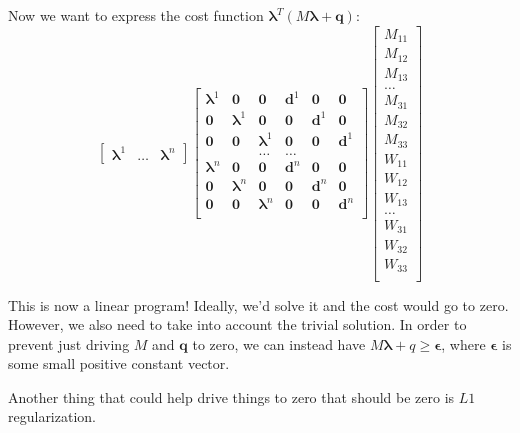 \documentclass{article}
\renewcommand{\vec}[1]{\boldsymbol{#1}}
\begin{document}
Now we want to express the cost function $\vec{\lambda}^T (M \vec{\lambda} + \vec{q})$:
\[
    \begin{bmatrix}
        \vec{\lambda} ^1 & \dots & \vec{\lambda} ^n
    \end{bmatrix}
    \begin{bmatrix}
        \vec{\lambda} ^1 & \vec{0} & \vec{0} & \vec{d}^1 & \vec{0} & \vec{0} \\
        \vec{0} & \vec{\lambda} ^1 & \vec{0} & \vec{0} & \vec{d}^1 & \vec{0} \\
        \vec{0} & \vec{0} & \vec{\lambda} ^1 & \vec{0} & \vec{0} & \vec{d}^1 \\
                & & \dots & \dots & & \\
        \vec{\lambda} ^n & \vec{0} & \vec{0} & \vec{d}^n & \vec{0} & \vec{0} \\
        \vec{0} & \vec{\lambda} ^n & \vec{0} & \vec{0} & \vec{d}^n & \vec{0} \\
        \vec{0} & \vec{0} & \vec{\lambda} ^n & \vec{0} & \vec{0} & \vec{d}^n \\
    \end{bmatrix}
    \begin{bmatrix}
        M_{11} \\
        M_{12} \\
        M_{13} \\
        \dots \\
        M_{31} \\
        M_{32} \\
        M_{33} \\
        W_{11} \\
        W_{12} \\
        W_{13} \\
        \dots \\
        W_{31} \\
        W_{32} \\
        W_{33} \\
    \end{bmatrix}
\]

This is now a linear program! Ideally, we'd solve it and the cost would go to zero. However, we also need to take into account the trivial solution. In order to prevent just driving $M$ and $\vec{q}$ to zero, we can instead have $M \vec{\lambda} + q \geq \vec{\epsilon}$, where $\vec{\epsilon}$ is some small positive constant vector.

Another thing that could help drive things to zero that should be zero is $L1$ regularization.
\end{document}
